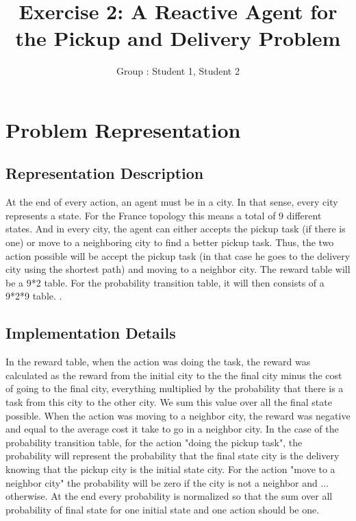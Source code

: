 \documentclass[11pt]{article}
\title{\bf Exercise 2: A Reactive Agent for the Pickup and Delivery Problem}
\author{Group \textnumero: Student 1, Student 2}
\begin{document}
\maketitle

\section{Problem Representation}

\subsection{Representation Description}

At the end of every action, an agent must be in a city. In that sense, every city represents a state. For the France topology this means a total of 9 different states. And in every city, the agent can either accepts the pickup task (if there is one) or move to a neighboring city to find a better pickup task. Thus, the two action possible will be accept the pickup task (in that case he goes to the delivery city using the shortest path) and moving to a neighbor city. The reward table will be a 9*2 table. For the probability transition table, it will then consists of a 9*2*9 table. .

\subsection{Implementation Details}

In the reward table, when the action was doing the task, the reward was calculated as the reward from the initial city to the the final city minus the cost of going to the final city, everything multiplied by the probability that there is a task from this city to the other city. We sum this value over all the final state possible. When the action was moving to a neighbor city, the reward was negative and equal to the average cost it take to go in a neighbor city. In the case of the probability transition table, for the action "doing the pickup task", the probability will represent the probability that the final state city is the delivery knowing that the pickup city is the initial state city. For the action "move to a neighbor city" the probability will be zero if the city is not a neighbor and ... otherwise. At the end every probability is normalized so that the sum over all probability of final state for one initial state and one action should be one.
\end{document}

